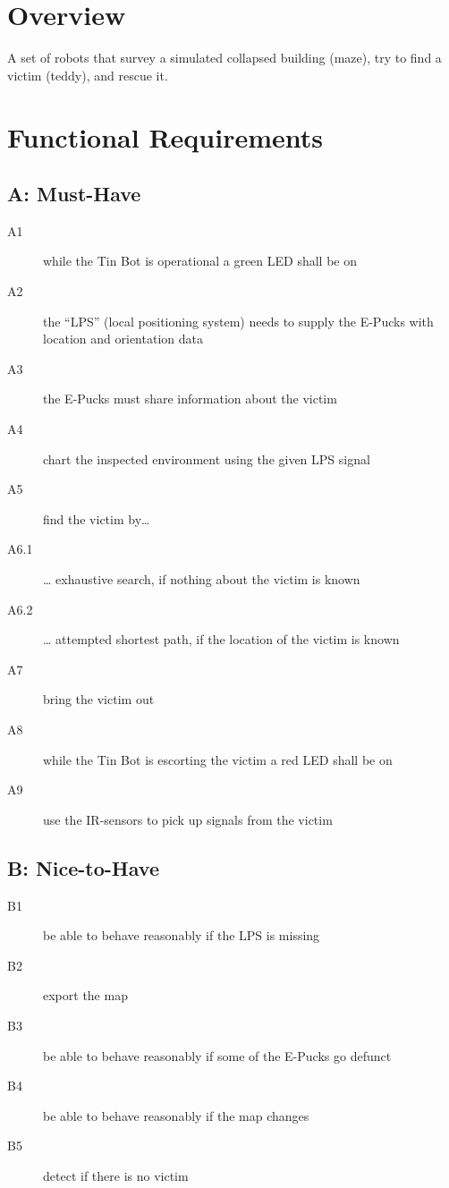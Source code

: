 \documentclass[a4paper,parskip,headheight=38pt]{scrartcl} %
\begin{document}
\section{Overview}
A set of robots that survey a simulated collapsed building (maze), try to find a victim (teddy), and rescue it.

\section{Functional Requirements}
\subsection*{A: Must-Have}
\begin{description}
\item[A1] while the Tin Bot is operational a green LED shall be on
\item[A2] the \enquote{LPS} (local positioning system) needs to supply the E-Pucks with location and orientation data
\item[A3] the E-Pucks must share information about the victim
\item[A4] chart the inspected environment using the given LPS signal
\item[A5] find the victim by…
\item[A6.1] … exhaustive search, if nothing about the victim is known
\item[A6.2] … attempted shortest path, if the location of the victim is known
\item[A7] bring the victim out
\item[A8] while the Tin Bot is escorting the victim a red LED shall be on
\item[A9] use the IR-sensors to pick up signals from the victim
\end{description}

\subsection*{B: Nice-to-Have}
\begin{description}
\item[B1] be able to behave reasonably if the LPS is missing
\item[B2] export the map
\item[B3] be able to behave reasonably if some of the E-Pucks go defunct
\item[B4] be able to behave reasonably if the map changes
\item[B5] detect if there is no victim
\end{description}
\end{document}
